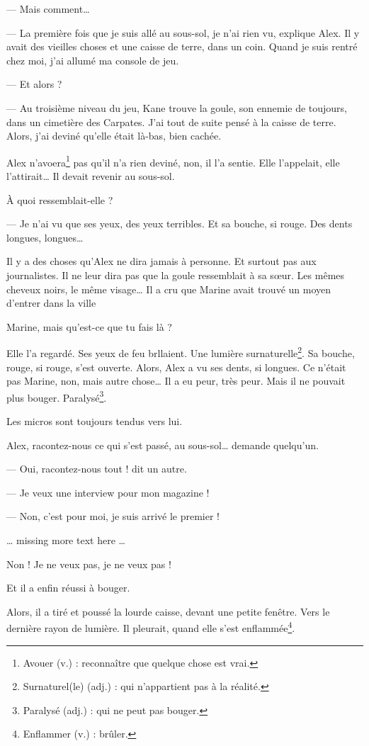 --- Mais comment\ldots{}

--- La première fois que je suis allé au sous-sol, je n'ai rien vu, explique Alex. Il y avait des vieilles choses et une caisse
    de terre, dans un coin. Quand je suis rentré chez moi, j'ai allumé ma console de jeu.

--- Et alors ?

--- Au troisième niveau du jeu, Kane trouve la goule, son ennemie de toujours, dans un cimetière des Carpates. J'ai tout de suite
    pensé à la caisse de terre. Alors, j'ai deviné qu'elle était là-bas, bien cachée. \fg{}

Alex n'avoera\footnote{Avouer (v.) : reconnaître que quelque chose est vrai.} pas qu'il n'a rien deviné, non, il l'a sentie. Elle
l'appelait, elle l'attirait\ldots{} Il devait revenir au sous-sol.

\og À quoi ressemblait-elle ?

--- Je n'ai vu que ses yeux, des yeux terribles. Et sa bouche, si rouge. Des dents longues, longues\ldots{} \fg{}

Il y a des choses qu'Alex ne dira jamais à personne. Et surtout pas aux journalistes. Il ne leur dira pas que la goule ressemblait
à sa s\oe{}ur. Les mêmes cheveux noirs, le même visage\ldots{} Il a cru que Marine avait trouvé un moyen d'entrer dans la ville

\og Marine, mais qu'est-ce que tu fais là ? \fg{}

Elle l'a regardé. Ses yeux de feu brllaient. Une lumière surnaturelle\footnote{Surnaturel(le) (adj.) : qui n'appartient pas à la
réalité.}. Sa bouche, rouge, si rouge, s'est ouverte. Alors, Alex a vu ses dents, si longues. Ce n'était pas Marine, non, mais
autre chose\ldots{} Il a eu peur, très peur. Mais il ne pouvait plus bouger. Paralysé\footnote{Paralysé (adj.) : qui ne peut pas
bouger.}.

Les micros sont toujours tendus vers lui.

\og Alex, racontez-nous ce qui s'est passé, au sous-sol\ldots{} demande quelqu'un.

--- Oui, racontez-nous tout ! dit un autre.

--- Je veux une interview pour mon magazine !

--- Non, c'est pour moi, je suis arrivé le premier ! \fg{}

\ldots{} missing more text here \ldots{}

\og Non ! Je ne veux pas, je ne veux pas ! \fg{}

Et il a enfin réussi à bouger.

Alors, il a tiré et poussé la lourde caisse, devant une petite fenêtre. Vers le dernière rayon de lumière. Il pleurait, quand elle
s'est enflammée\footnote{Enflammer (v.) : brûler.}.
